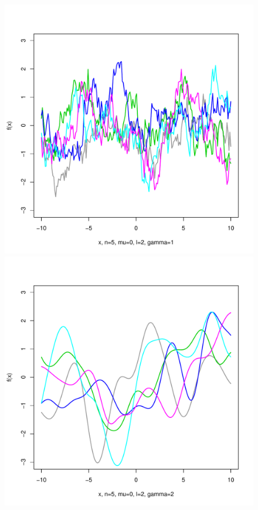 \documentclass[12pt,letterpaper]{article}
\begin{document}
\begin{figure}
\begin{center}
\includegraphics[scale=0.2]{hw321/n5-m0-l2-g2.pdf}
\includegraphics[scale=0.2]{hw321/n5-m0-l2-g4.pdf}

\end{center}
\end{figure}
\end{document}
